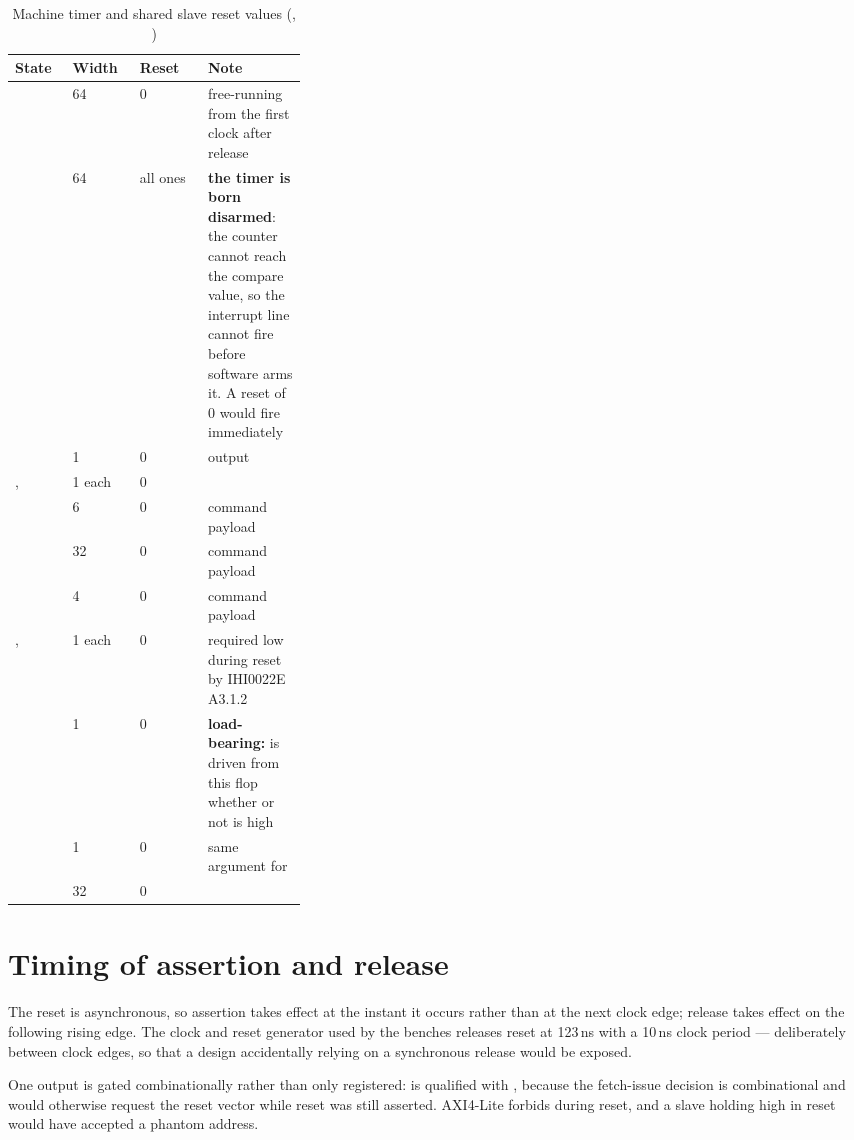 \begin{table}[H]
\centering
\caption{Machine timer and shared slave reset values
(, )}
\label{tab:tmrreset}
\begin{tabular}{@{}lllL{0.34\linewidth}@{}}
\toprule
\textbf{State} & \textbf{Width} & \textbf{Reset} & \textbf{Note} \\
\midrule
{}     & 64 & 0 & free-running from the first clock after release \\
  & 64 & all ones & \textbf{the timer is born disarmed}: the
  counter cannot reach the compare value, so the interrupt line cannot fire
  before software arms it. A reset of 0 would fire immediately \\
        & 1  & 0 & output \\
\midrule
{},  & 1 each & 0 & \\
     & 6  & 0 & command payload \\
     & 32 & 0 & command payload \\
     & 4  & 0 & command payload \\
,  & 1 each & 0 & required low during
  reset by IHI0022E A3.1.2 \\
& 1  & 0 & \textbf{load-bearing:}  is driven from
  this flop whether or not  is high \\
& 1  & 0 & same argument for  \\
& 32 & 0 & \\
\bottomrule
\end{tabular}
\end{table}

\section{Timing of assertion and release}

The reset is asynchronous, so assertion takes effect at the instant it occurs
rather than at the next clock edge; release takes effect on the following rising
edge. The clock and reset generator used by the benches releases reset at
123\,ns with a 10\,ns clock period --- deliberately between clock edges, so that
a design accidentally relying on a synchronous release would be exposed.

One output is gated combinationally rather than only registered:
 is qualified with , because the fetch-issue
decision is combinational and would otherwise request the reset vector while
reset was still asserted. AXI4-Lite forbids  during reset, and a
slave holding  high in reset would have accepted a phantom
address.

